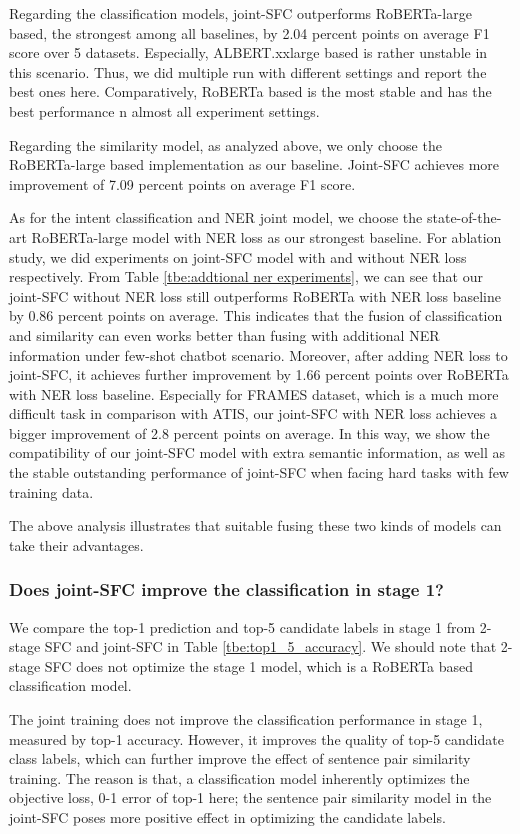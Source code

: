 Regarding the classification models, joint-SFC
outperforms RoBERTa-large based, the strongest among all baselines, 
by 2.04 percent points on average F1 score over 5 datasets. 
Especially, ALBERT.xxlarge based is rather unstable in this scenario. Thus, 
we did multiple run with different settings and report the best ones here. 
Comparatively, RoBERTa based is the most stable and has the best performance 
n almost all experiment settings.

Regarding the similarity model, as analyzed above, we only choose the
RoBERTa-large based implementation as our baseline. Joint-SFC achieves more improvement of
7.09 percent points on average F1 score. 

As for the intent classification and NER joint model, we choose the state-of-the-art RoBERTa-large model with NER loss as our strongest baseline. For ablation study, we did experiments on joint-SFC model with and without NER loss respectively. From Table \ref{tbe:addtional ner experiments}, we can see that our joint-SFC without NER loss still outperforms RoBERTa with NER loss baseline by 0.86 percent points on average. This indicates that the fusion of classification and similarity can even works better than fusing with additional NER information under few-shot chatbot scenario. Moreover, after adding NER loss to joint-SFC, it achieves further improvement by 1.66 percent points over RoBERTa with NER loss baseline. Especially for FRAMES dataset, which is a much more difficult task in comparison with ATIS, our joint-SFC with NER loss achieves a bigger improvement of 2.8 percent points on average. In this way, we show the compatibility of our joint-SFC model with extra semantic information, as well as the stable outstanding performance of joint-SFC when facing hard tasks with few training data.

The above analysis illustrates that suitable fusing these two kinds of models
can take their advantages.

\subsubsection*{Does joint-SFC improve the classification in stage 1?}
We compare the top-1 prediction and top-5 candidate labels in stage 1 from
2-stage SFC and joint-SFC in Table \ref{tbe:top1_5_accuracy}. We should note
that 2-stage SFC does not optimize the stage 1 model, which is a RoBERTa
based classification model.

The joint training does not improve the classification performance in stage 1,
measured by top-1 accuracy. However, it improves the quality of top-5
candidate class labels, which can further improve the effect of sentence pair
similarity training. The reason is that, a classification model
inherently optimizes the objective loss, 0-1 error of top-1 here; the sentence
pair similarity model in the joint-SFC poses more positive effect in optimizing the 
candidate labels.


